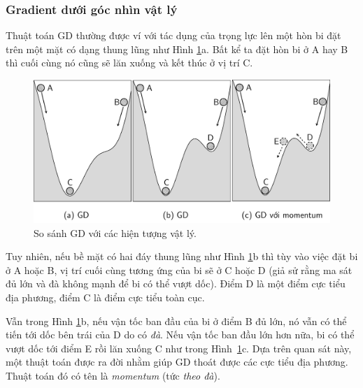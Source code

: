  
\subsubsection{Gradient dưới góc nhìn vật lý }
 
Thuật toán GD thường được ví với tác dụng của trọng lực lên một hòn bi đặt trên
một mặt có dạng thung lũng như Hình \ref{fig:8_1}a. Bất kể ta đặt hòn bi ở A
hay B thì cuối cùng nó cũng sẽ lăn xuống và kết thúc ở vị trí C.
 
\begin{figure}[t]
\centering
    \includegraphics[width = \textwidth]{Chapters/04_GradientDescent/GD/latex/momentum_bw.pdf}
    \caption[]{So sánh GD với các hiện tượng vật lý.}
    \label{fig:8_1}
\end{figure}
Tuy nhiên, nếu bề mặt có hai đáy thung lũng như Hình \ref{fig:8_1}b thì tùy
vào việc đặt bi ở A hoặc B, vị trí cuối cùng tương ứng của bi sẽ ở C hoặc D (giả
sử rằng ma sát đủ lớn và đà không mạnh để bi có thể vượt dốc). Điểm D
là một điểm cực tiểu địa phương, điểm C là điểm cực tiểu toàn cục. 

Vẫn trong Hình \ref{fig:8_1}b, nếu vận tốc ban đầu của bi ở điểm B đủ lớn, nó
vẫn có thể tiến tới dốc bên trái của D do có \textit{đà}. Nếu vận tốc
ban đầu lớn hơn nữa, bi có thể vượt dốc tới điểm E rồi lăn xuống C như trong
Hình~\ref{fig:8_1}c. Dựa trên quan sát này, một thuật toán được ra đời nhằm giúp
GD thoát được các cực tiểu địa phương. Thuật toán đó có tên là \textit{momentum}
(tức \textit{theo đà}).
 
